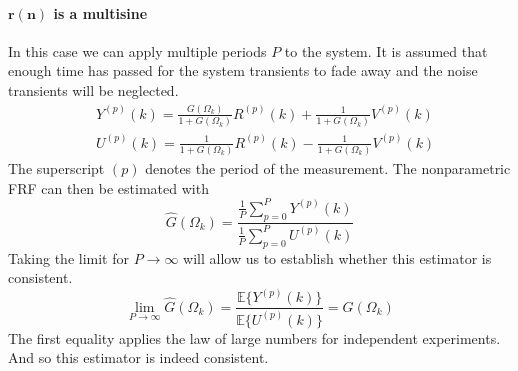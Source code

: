 \paragraph{$\boldsymbol{r(n)}$ is a multisine}
In this case we can apply multiple periods $P$ to the system. It is assumed that enough time has passed for the system transients to fade away and the noise transients will be neglected.
\begin{align*}
    &Y^{(p)}(k) = \frac{G(\Omega_k)}{1+G(\Omega_k)} R^{(p)}(k) + \frac{1}{1+G(\Omega_k)} V^{(p)}(k)\\
    &U^{(p)}(k) = \frac{1}{1+G(\Omega_k)} R^{(p)}(k) - \frac{1}{1+G(\Omega_k)} V^{(p)}(k)
\end{align*}
The superscript $(p)$ denotes the period of the measurement. The nonparametric FRF can then be estimated with
\begin{equation}
    \hat G(\Omega_k) = \frac{ \frac{1}{P}\sum_{p=0}^P Y^{(p)}(k) } { \frac{1}{P}\sum_{p=0}^P U^{(p)}(k) }
    \label{eq:G_estimator_for_MS}
\end{equation}
Taking the limit for $P \rightarrow \infty$ will allow us to establish whether this estimator is consistent.
\begin{equation*}
    \lim_{P\rightarrow\infty} \hat G(\Omega_k) = \frac{ \mathbb{E}\{ Y^{(p)}(k) \}} { \mathbb{E}\{ U^{(p)}(k) \}} = G(\Omega_k)
\end{equation*}
The first equality applies the law of large numbers for independent experiments. And so this estimator is indeed consistent.

